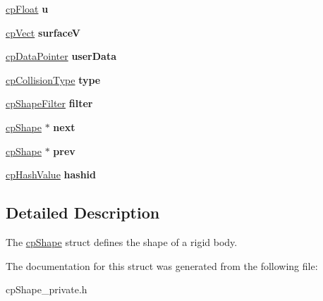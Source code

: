 \begin{DoxyCompactItemize}
\item 
\hypertarget{structcp_shape_a9fbe92c5b0971f43fe0519241c6a1b0e}{}\hyperlink{group__basic_types_gac1ed65573e035bf892505768c852d8d3}{cp\+Float} {\bfseries u}\label{structcp_shape_a9fbe92c5b0971f43fe0519241c6a1b0e}

\item 
\hypertarget{structcp_shape_a462e22e2a9f67af774e965f9931c8538}{}\hyperlink{structcp_vect}{cp\+Vect} {\bfseries surface\+V}\label{structcp_shape_a462e22e2a9f67af774e965f9931c8538}

\item 
\hypertarget{structcp_shape_a8e8ca2f3736f917d06a88b9f648f5e4c}{}\hyperlink{group__basic_types_ga2ac2c3c31e21893941f9e4f8ee279447}{cp\+Data\+Pointer} {\bfseries user\+Data}\label{structcp_shape_a8e8ca2f3736f917d06a88b9f648f5e4c}

\item 
\hypertarget{structcp_shape_abae1c01e2b8c70cb15bf313816c8af60}{}\hyperlink{group__basic_types_gae83e2f50965eb441e36ffff1e32e6d02}{cp\+Collision\+Type} {\bfseries type}\label{structcp_shape_abae1c01e2b8c70cb15bf313816c8af60}

\item 
\hypertarget{structcp_shape_a2a5150b1f512b355038355b46c447ae7}{}\hyperlink{structcp_shape_filter}{cp\+Shape\+Filter} {\bfseries filter}\label{structcp_shape_a2a5150b1f512b355038355b46c447ae7}

\item 
\hypertarget{structcp_shape_ad8efb848853d473bf2af4618baa1838b}{}\hyperlink{structcp_shape}{cp\+Shape} $\ast$ {\bfseries next}\label{structcp_shape_ad8efb848853d473bf2af4618baa1838b}

\item 
\hypertarget{structcp_shape_a01dcf453d94fef71ac8f792c3693fa98}{}\hyperlink{structcp_shape}{cp\+Shape} $\ast$ {\bfseries prev}\label{structcp_shape_a01dcf453d94fef71ac8f792c3693fa98}

\item 
\hypertarget{structcp_shape_a98ce6465c208b0e053a4606bcb7e26c4}{}\hyperlink{group__basic_types_gae7eb4775a9f43914a15553ca65a048f4}{cp\+Hash\+Value} {\bfseries hashid}\label{structcp_shape_a98ce6465c208b0e053a4606bcb7e26c4}

\end{DoxyCompactItemize}


\subsection{Detailed Description}
The \hyperlink{structcp_shape}{cp\+Shape} struct defines the shape of a rigid body. 

The documentation for this struct was generated from the following file\+:\begin{DoxyCompactItemize}
\item 
cp\+Shape\+\_\+private.\+h\end{DoxyCompactItemize}
